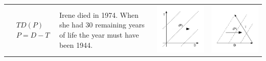 \documentclass[11pt,oneside,a4paper]{article} %
\begin{document}
\begin{center}
\begin{longtable}{m{}m{}m{}m{}}
  \midrule
  $$\begin{aligned}
    &TD(P) \\
    &P = D - T
  \end{aligned}$$ &
  Irene died in 1974. When she had 30 remaining years of life the year must
  have been 1944.& \includegraphics[width =
  \linewidth]{Figures/JonasTable/TDp.pdf} & \includegraphics[width = \linewidth]{Figures/JonasTable/TDp_iso.pdf}  \\

\end{longtable}
\end{center}
\end{document}
